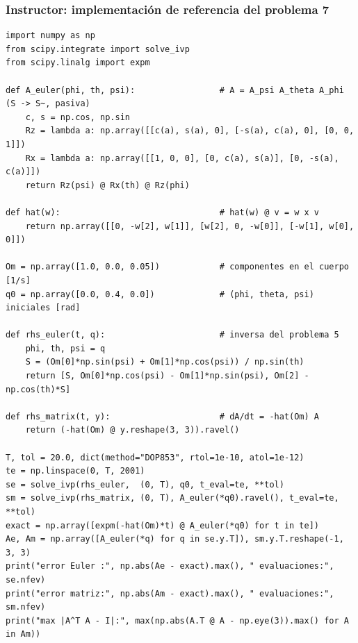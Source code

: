 \documentclass[spanish]{beamer}
\begin{document}
\begin{frame}[fragile]
  \frametitle{Instructor: implementación de referencia del problema 7}
\begin{lstlisting}
import numpy as np
from scipy.integrate import solve_ivp
from scipy.linalg import expm

def A_euler(phi, th, psi):                 # A = A_psi A_theta A_phi  (S -> S~, pasiva)
    c, s = np.cos, np.sin
    Rz = lambda a: np.array([[c(a), s(a), 0], [-s(a), c(a), 0], [0, 0, 1]])
    Rx = lambda a: np.array([[1, 0, 0], [0, c(a), s(a)], [0, -s(a), c(a)]])
    return Rz(psi) @ Rx(th) @ Rz(phi)

def hat(w):                                # hat(w) @ v = w x v
    return np.array([[0, -w[2], w[1]], [w[2], 0, -w[0]], [-w[1], w[0], 0]])

Om = np.array([1.0, 0.0, 0.05])            # componentes en el cuerpo [1/s]
q0 = np.array([0.0, 0.4, 0.0])             # (phi, theta, psi) iniciales [rad]

def rhs_euler(t, q):                       # inversa del problema 5
    phi, th, psi = q
    S = (Om[0]*np.sin(psi) + Om[1]*np.cos(psi)) / np.sin(th)
    return [S, Om[0]*np.cos(psi) - Om[1]*np.sin(psi), Om[2] - np.cos(th)*S]

def rhs_matrix(t, y):                      # dA/dt = -hat(Om) A
    return (-hat(Om) @ y.reshape(3, 3)).ravel()

T, tol = 20.0, dict(method="DOP853", rtol=1e-10, atol=1e-12)
te = np.linspace(0, T, 2001)
se = solve_ivp(rhs_euler,  (0, T), q0, t_eval=te, **tol)
sm = solve_ivp(rhs_matrix, (0, T), A_euler(*q0).ravel(), t_eval=te, **tol)
exact = np.array([expm(-hat(Om)*t) @ A_euler(*q0) for t in te])
Ae, Am = np.array([A_euler(*q) for q in se.y.T]), sm.y.T.reshape(-1, 3, 3)
print("error Euler :", np.abs(Ae - exact).max(), " evaluaciones:", se.nfev)
print("error matriz:", np.abs(Am - exact).max(), " evaluaciones:", sm.nfev)
print("max |A^T A - I|:", max(np.abs(A.T @ A - np.eye(3)).max() for A in Am))
\end{lstlisting}
\end{frame}
\end{document}
